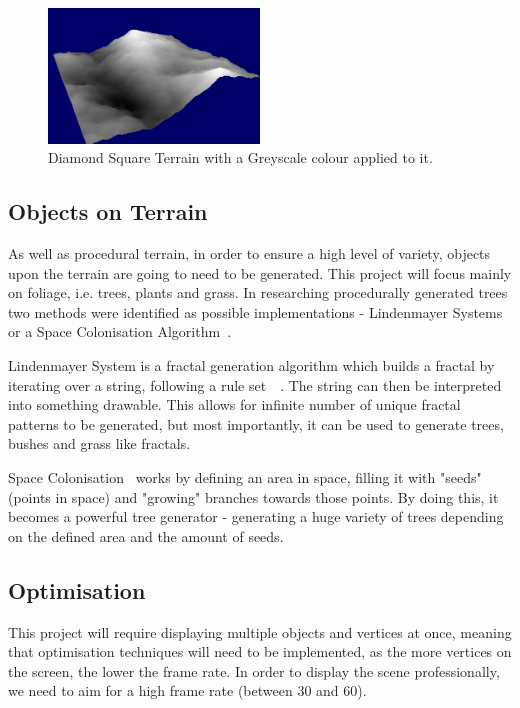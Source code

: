 \documentclass[a4paper,10pt]{report}
\begin{document}
\begin{figure}[h!]
    \centering
  \includegraphics[width=0.5\textwidth]{Images/Screenshots/DiamondSquareGreyScale.png}
 \caption{Diamond Square Terrain with a Greyscale colour applied to it.}
 \label{fig:DiamondSquareGrey}
\end{figure}

\subsection{Objects on Terrain}

As well as procedural terrain, in order to ensure a high level of variety, objects upon the terrain are going to need to be generated. This project will focus mainly on foliage, i.e. trees, plants and grass. In researching procedurally generated trees two methods were identified as possible implementations - Lindenmayer Systems~\cite{lindenmayer2017} or a Space Colonisation Algorithm~\cite{runions2007modeling}. 

Lindenmayer System is a fractal generation algorithm which builds a fractal by iterating over a string, following a rule set~\cite{prusinkiewicz2012algorithmic}~\cite{crownover1995introduction}. The string can then be interpreted into something drawable. This allows for infinite number of unique fractal patterns to be generated, but most importantly, it can be used to generate trees, bushes and grass like fractals.  

Space Colonisation~\cite{runions2007modeling} works by defining an area in space, filling it with "seeds" (points in space) and "growing" branches towards those points. By doing this, it becomes a powerful tree generator - generating a huge variety of trees depending on the defined area and the amount of seeds.

\subsection{Optimisation}
This project will require displaying multiple objects and vertices at once, meaning that optimisation techniques will need to be implemented, as the more vertices on the screen, the lower the frame rate. In order to display the scene professionally, we need to aim for a high frame rate (between 30 and 60).  \medskip
\end{document}
